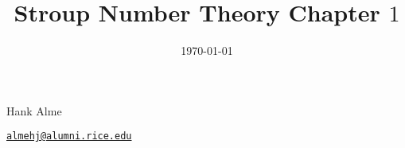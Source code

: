 \documentclass[12pt]{amsart}
\title{Stroup Number Theory Chapter $1$}
\date{\today}
\theoremstyle{definition}
\theoremstyle{remark}
\begin{document}
\maketitle

\vspace*{-0.25in}
\centerline{Hank Alme}
\centerline{\href{mailto:almehj@alumni.rice.edu}{{\tt almehj@alumni.rice.edu}}}
\vspace*{0.15in}


\end{document}
